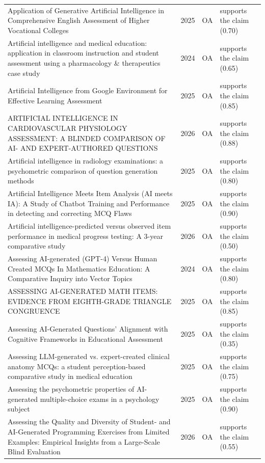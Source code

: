 \begin{longtable}{@{}%
  >{\raggedright\arraybackslash}p{}c%
  >{\raggedright\arraybackslash}p{}%
  >{\raggedright\arraybackslash}p{}@{}}
Application of Generative Artificial Intelligence in Comprehensive English Assessment of Higher Vocational Colleges & 2025 & OA & supports the claim (0.70) \\
Artificial intelligence and medical education: application in classroom instruction and student assessment using a pharmacology \& therapeutics case study & 2024 & OA & supports the claim (0.65) \\
Artificial Intelligence from Google Environment for Effective Learning Assessment & 2025 & OA & supports the claim (0.85) \\
ARTIFICIAL INTELLIGENCE IN CARDIOVASCULAR PHYSIOLOGY ASSESSMENT: A BLINDED COMPARISON OF AI- AND EXPERT-AUTHORED QUESTIONS & 2026 & OA & supports the claim (0.88) \\
Artificial intelligence in radiology examinations: a psychometric comparison of question generation methods & 2025 & OA & supports the claim (0.80) \\
Artificial Intelligence Meets Item Analysis (AI meets IA): A Study of Chatbot Training and Performance in detecting and correcting MCQ Flaws & 2025 & OA & supports the claim (0.90) \\
Artificial intelligence-predicted versus observed item performance in medical progress testing: A 3-year comparative study & 2026 & OA & supports the claim (0.50) \\
Assessing AI-generated (GPT-4) Versus Human Created MCQs In Mathematics Education: A Comparative Inquiry into Vector Topics & 2024 & OA & supports the claim (0.80) \\
ASSESSING AI-GENERATED MATH ITEMS: EVIDENCE FROM EIGHTH-GRADE TRIANGLE CONGRUENCE & 2025 & OA & supports the claim (0.85) \\
Assessing AI-Generated Questions' Alignment with Cognitive Frameworks in Educational Assessment & 2025 & OA & supports the claim (0.35) \\
Assessing LLM-generated vs. expert-created clinical anatomy MCQs: a student perception-based comparative study in medical education & 2025 & OA & supports the claim (0.75) \\
Assessing the psychometric properties of AI-generated multiple-choice exams in a psychology subject & 2025 & OA & supports the claim (0.90) \\
Assessing the Quality and Diversity of Student- and AI-Generated Programming Exercises from Limited Examples: Empirical Insights from a Large-Scale Blind Evaluation & 2026 & OA & supports the claim (0.55) \\

\end{longtable}
